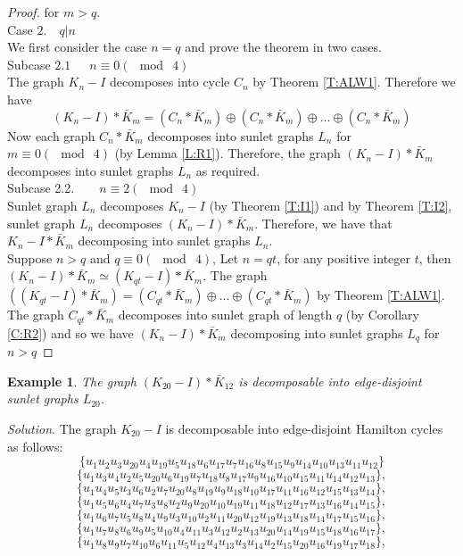 \documentclass[12pt]{report}
\newtheorem{exm}[thm]{Example}
\begin{document}
\begin{proof}
for $m>q$.
\\
Case $2$.\ \ $q|n$\\
We first consider the case $n=q$ and prove the theorem in two cases.\\
Subcase $2.1$\ \ \ $n\equiv 0(\mod\ 4)$\\
The graph $K_n-I$ decomposes into cycle $C_n$ by Theorem
\ref{T:ALW1}. Therefore we have
$$(K_n-I)*\bar{K}_m=(C_n*\bar{K}_m)\oplus (C_n*\bar{K}_m)\oplus...\oplus(C_n*\bar{K}_m)$$
Now each graph $C_n*\bar{K}_m$ decomposes into sunlet graphs $L_n$
for $m\equiv 0(\mod\ 4)$ (by Lemma \ref{L:R1}). Therefore, the graph
$(K_n-I)*\bar{K}_m$ decomposes into sunlet graphs $L_n$ as required.
\\
Subcase 2.2.\ \ \ \ $n\equiv 2(\mod \ 4)$\\
Sunlet graph $L_n$ decomposes $K_n-I$ (by Theorem \ref{T:I1}) and by Theorem \ref{T:I2}, sunlet graph $L_n$ decomposes $(K_n-I)*\bar{K}_m$. Therefore, we have that $K_n-I*\bar{K}_m$ decomposing into sunlet graphs $L_n$.\\
Suppose $n>q$ and $q\equiv 0(\mod\ 4)$, Let $n=qt$, for any positive
integer $t$, then $(K_n-I)*\bar{K}_m\simeq (K_{qt}-I)*\bar{K}_m$.
The graph $((K_{qt}-I)*\bar{K}_m)=(C_{qt}*\bar{K}_m) \oplus
...\oplus (C_{qt}*\bar{K}_m)$ by Theorem \ref{T:ALW1}. The graph
$C_{qt}*\bar{K}_m$ decomposes into sunlet graph of length $q$ (by
Corollary \ref{C:R2}) and so we have  $(K_n-I)*\bar{K}_m$
decomposing into sunlet graphs $L_q$ for $n>q$
\end{proof}
\begin{exm}
The graph $(K_{20}-I)*\bar{K}_{12}$ is decomposable into
edge-disjoint sunlet graphs $L_{20}$.
\end{exm}
{\em Solution}. The graph $K_{20}-I$ is decomposable into
edge-disjoint Hamilton cycles as follows:
$$\{u_1u_2u_3u_{20}u_4u_{19}u_5u_{18}u_6u_{17}u_7u_{16}u_8u_{15}u_9u_{14}u_{10}u_{13}u_{11}u_{12}\}$$
$$\{u_1u_3u_4u_2u_5u_{20}u_6u_{19}u_7u_{18}u_8u_{17}u_9u_{16}u_{10}u_{15}u_{11}u_{14}u_{12}u_{13}\},$$
$$\{u_1u_4u_5u_3u_6u_{2}u_7u_{20}u_8u_{19}u_9u_{18}u_{10}u_{17}u_{11}u_{16}u_{12}u_{15}u_{13}u_{14}\},$$
$$\{u_1u_5u_6u_4u_7u_{3}u_8u_{2}u_9u_{20}u_{10}u_{19}u_{11}u_{18}u_{12}u_{17}u_{13}u_{16}u_{14}u_{15}\},$$
$$\{u_1u_6u_7u_5u_8u_{4}u_9u_{3}u_{10}u_{2}u_{11}u_{20}u_{12}u_{19}u_{13}u_{18}u_{14}u_{17}u_{15}u_{16}\},$$
$$\{u_1u_7u_8u_6u_9u_{5}u_{10}u_{4}u_{11}u_{3}u_{12}u_{2}u_{13}u_{20}u_{14}u_{19}u_{15}u_{18}u_{16}u_{17}\},$$
$$\{u_1u_8u_9u_7u_{10}u_{6}u_{11}u_{5}u_{12}u_{4}u_{13}u_{3}u_{14}u_{2}u_{15}u_{20}u_{16}u_{19}u_{17}u_{18}\},$$
\end{document}
